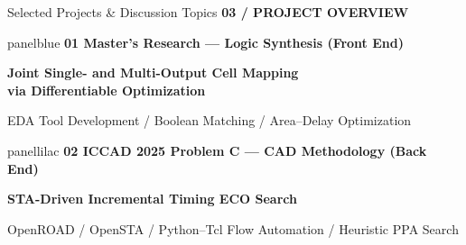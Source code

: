 \documentclass[aspectratio=169,10pt]{beamer}
\newcommand{\smalllabel}[1]{{\scriptsize\bfseries\color{Accent}\MakeUppercase{#1}}}
\begin{document}
\begin{frame}{Selected Projects \& Discussion Topics}
  \vspace{0.03cm}
  \smalllabel{03 / Project Overview}\par\vspace{0.11cm}
  \vfill
  \begin{beamercolorbox}[rounded=true,sep=0.20cm,wd=\linewidth]{panelblue}
    {\small\bfseries\color{AccentBlue}01 \quad Master's Research --- Logic Synthesis (Front End)}\par
    \vspace{0.05cm}
    {\normalsize\bfseries Joint Single- and Multi-Output Cell Mapping\\via Differentiable Optimization}\par
    \vspace{0.07cm}
    {\small EDA Tool Development \quad / \quad Boolean Matching \quad / \quad Area--Delay Optimization}
  \end{beamercolorbox}
  \vfill
  \begin{beamercolorbox}[rounded=true,sep=0.20cm,wd=\linewidth]{panellilac}
    {\small\bfseries\color{Accent}02 \quad ICCAD 2025 Problem C --- CAD Methodology (Back End)}\par
    \vspace{0.05cm}
    {\normalsize\bfseries STA-Driven Incremental Timing ECO Search}\par
    \vspace{0.07cm}
    {\small OpenROAD / OpenSTA \quad / \quad Python--Tcl Flow Automation \quad / \quad Heuristic PPA Search}
  \end{beamercolorbox}
  \vfill
\end{frame}

\end{document}
